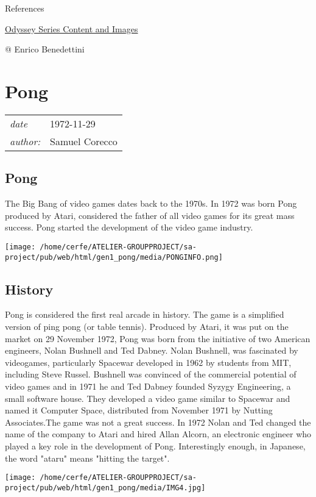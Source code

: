 \documentclass[a4paper,10pt]{book}
\newcommand{\pageHeader}[4]{
    \section{#1}
    \vspace{-0.3cm}
    \begin{table}[h!]
     \begin{tabular}{ll}
        \hline
        \textit{date} & #2 \\
        \textit{author: } & #3\\
        \hline
     \end{tabular}
    \end{table}
    \vspace{-0.3cm}
}
\begin{document}
 
 
 
 References 
 
 \href{https://it.wikipedia.org/wiki/Odyssey_(serie_di_console)}{Odyssey Series Content and Images }
 
 @ Enrico Benedettini 
 
 
 \newpage\pageHeader{Pong}{1972-11-29}{Samuel Corecco}{A page about Pong game}
 \subsection{Pong }
  The Big Bang of video games dates back to the 1970s. In 1972 was born Pong produced by Atari, considered the father of all video games for its great mass success. Pong started the development of the video game industry.
           
 \texttt{[image: /home/cerfe/ATELIER-GROUPPROJECT/sa-project/pub/web/html/gen1\_pong/media/PONGINFO.png]}
 
 
 
 \subsection{History }
 Pong is considered the first real arcade in history. The game is a simplified version of ping pong (or table tennis). Produced by Atari, it was put on the market on 29 November 1972,
Pong was born from the initiative of two American engineers, Nolan Bushnell and Ted Dabney. Nolan Bushnell, was fascinated by videogames, particularly Spacewar developed in 1962 by students from MIT, including Steve Russel.
Bushnell was convinced of the commercial potential of video games and in 1971 he and Ted Dabney founded Syzygy Engineering, a small software house. They developed a video game similar to Spacewar and named it Computer Space, distributed from November 1971 by Nutting Associates.The game was not a great success. In 1972 Nolan and Ted changed the name of the company to Atari and hired Allan Alcorn, an electronic engineer who played a key role in the development of Pong. Interestingly enough, in Japanese, the word "ataru" means "hitting the target".
 
 
 \texttt{[image: /home/cerfe/ATELIER-GROUPPROJECT/sa-project/pub/web/html/gen1\_pong/media/IMG4.jpg]}
 
\end{document}
